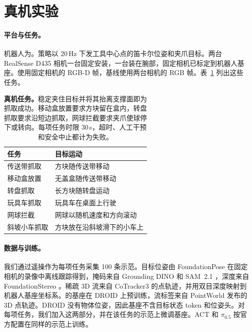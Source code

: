 \section{真机实验}
\label{app:real}

\paragraph{平台与任务。}
\label{app:real_platform}
机器人为\cfgRobotZh{}。策略以 20\,Hz 下发工具中心点的笛卡尔位姿和夹爪目标。两台 RealSense D435 相机一台固定安装，一台装在腕部，固定相机已标定到机器人基座。\ours 使用固定相机的 RGB-D 帧，基线使用两台相机的 RGB 帧。表~\ref{tab:real_tasks} 列出这些任务。

\begin{table}[!htbp]
\centering\footnotesize
\caption{\textbf{真机任务。}稳定夹住目标并将其抬离支撑面即为抓取成功。移动盒放置要求方块留在盒内，转盘抓取要求沿短边抓取，网球拦截要求夹爪使球停下或转向。每项任务时限 30\,s，超时、人工干预和安全中止都计为失败。}
\label{tab:real_tasks}
\setlength{\tabcolsep}{4pt}
\begin{tabularx}{\linewidth}{@{}l>{\raggedright\arraybackslash}X@{}}
\toprule
任务 & 目标运动 \\
\midrule
传送带抓取 & 方块随传送带移动 \\
移动盒放置 & 无盖盒随传送带移动 \\
转盘抓取 & 长方块随转盘运动 \\
玩具车抓取 & 玩具车在桌面上行驶 \\
网球拦截 & 网球以随机速度和方向滚动 \\
斜坡小车抓取 & 方块放在沿斜坡滑下的小车上 \\
\bottomrule
\end{tabularx}
\end{table}

\paragraph{数据与训练。}
\label{app:tracker}
\label{app:lifting}
\label{app:posttraining}
我们通过遥操作为每项任务采集 100 条示范。目标位姿由 FoundationPose \cite{foundationpose} 在固定相机的录像中离线跟踪得到，掩码来自 Grounding DINO \cite{groundingdino} 和 SAM~2.1 \cite{sam2}，深度来自 FoundationStereo \cite{foundationstereo}。稀疏 3D 流来自 CoTracker3 \cite{cotracker3} 的点轨迹，并用双目深度映射到机器人基座坐标系。\ours 的基座在 DROID \cite{droid} 上预训练，流标签来自 PointWorld \cite{pointworld} 发布的 3D 点轨迹。DROID 没有物体位姿，因此基座不含目标状态 token 和位姿头。对每项任务，我们加入这两部分，并在该任务的示范上微调基座。ACT 和 $\pi_{0.5}$ 按官方配置在同样的示范上训练。

